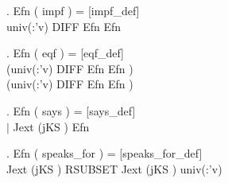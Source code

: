 \begin{figure}[t]
\begin{minipage}{1.0\linewidth}
\begin{small}
\HOLTokenTurnstile{} \HOLTokenForall{}    .
     Efn    ( impf ) = \hfill{[impf\_def]}\\\hspace*{0.3in}
     univ(:'v) DIFF Efn     \HOLTokenUnion{} Efn     

\HOLTokenTurnstile{} \HOLTokenForall{}    .
     Efn    ( eqf ) = \hfill{[eqf\_def]}\\\hspace*{0.3in}
     (univ(:'v) DIFF Efn     \HOLTokenUnion{} Efn    ) \HOLTokenInter{}\\\hspace*{0.3in}
     (univ(:'v) DIFF Efn     \HOLTokenUnion{} Efn    )

\HOLTokenTurnstile{} \HOLTokenForall{}    .
     Efn    ( says ) = \hfill{[says\_def]}\\\hspace*{0.3in} \HOLTokenLeftbrace{} $\mid$ Jext (jKS )   \HOLTokenSubset{} Efn    \HOLTokenRightbrace{}

\HOLTokenTurnstile{} \HOLTokenForall{}    .
     Efn    ( speaks_for ) = \hfill{[speaks\_for\_def]}\\\hspace*{0.3in}
 Jext (jKS )  RSUBSET Jext (jKS )   univ(:'v)  \HOLTokenLeftbrace{}\HOLTokenRightbrace{}


\end{small}
\end{minipage}
\end{figure}
